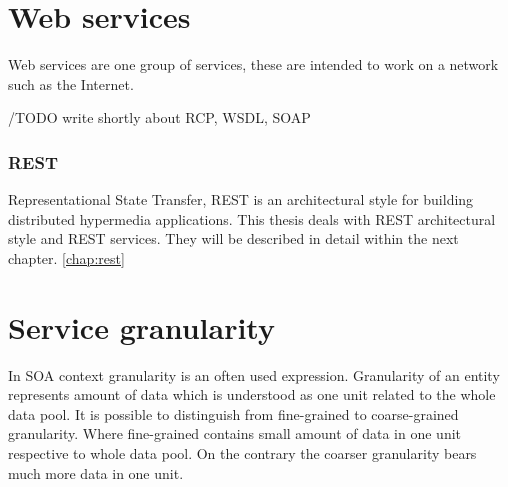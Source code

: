

\section{Web services}
Web services are one group of services, these are intended to work on a network such as the Internet.

/TODO write shortly about RCP, WSDL, SOAP
 
\subsubsection{REST}

Representational State Transfer, REST is an architectural style for building distributed hypermedia applications. This thesis deals with REST architectural style and REST services. They will be described in detail within the next chapter. \ref{chap:rest}

\section{Service granularity}
\label{sec:granularity}
In SOA context granularity is an often used expression. Granularity of an entity represents amount of data which is understood as one unit related to the whole data pool. It is possible to distinguish from fine-grained to coarse-grained granularity. Where fine-grained contains small amount of data in one unit respective to whole data pool. On the contrary the coarser granularity bears much more data in one unit.

